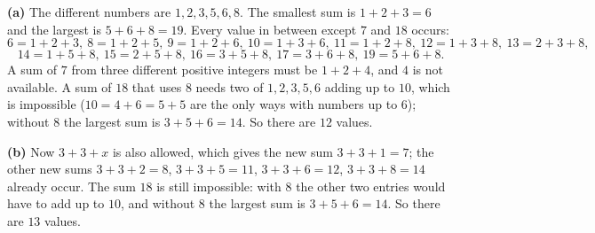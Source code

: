 \textbf{(a)} The different numbers are $1,2,3,5,6,8$. The smallest sum is $1+2+3=6$ and the largest is $5+6+8=19$. Every value in between except $7$ and $18$ occurs:
\[6=1+2+3,\ 8=1+2+5,\ 9=1+2+6,\ 10=1+3+6,\ 11=1+2+8,\ 12=1+3+8,\ 13=2+3+8,\]
\[14=1+5+8,\ 15=2+5+8,\ 16=3+5+8,\ 17=3+6+8,\ 19=5+6+8.\]
A sum of $7$ from three different positive integers must be $1+2+4$, and $4$ is not available. A sum of $18$ that uses $8$ needs two of $1,2,3,5,6$ adding up to $10$, which is impossible ($10=4+6=5+5$ are the only ways with numbers up to $6$); without $8$ the largest sum is $3+5+6=14$. So there are $\boxed{12}$ values.

\textbf{(b)} Now $3+3+x$ is also allowed, which gives the new sum $3+3+1=7$; the other new sums $3+3+2=8$, $3+3+5=11$, $3+3+6=12$, $3+3+8=14$ already occur. The sum $18$ is still impossible: with $8$ the other two entries would have to add up to $10$, and without $8$ the largest sum is $3+5+6=14$. So there are $\boxed{13}$ values.
